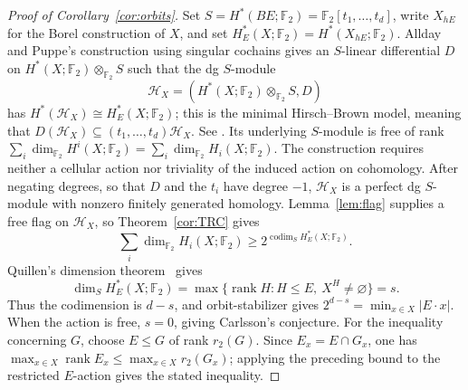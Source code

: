 \documentclass[11pt,reqno]{amsart}
\theoremstyle{plain}
\theoremstyle{definition}
\DeclareMathOperator{\rank}{rank}
\DeclareMathOperator{\codim}{codim}
\newcommand{\Ff}{\mathbb{F}}
\begin{document}
\begin{proof}[Proof of Corollary~\ref{cor:orbits}]
Set $S=H^*(BE;\Ff_2)=\Ff_2[t_1,\dots,t_d]$, write $X_{hE}$ for the Borel construction of $X$,
and set $H_E^*(X;\Ff_2)=H^*(X_{hE};\Ff_2)$.  Allday and Puppe's construction using singular cochains gives
an $S$-linear differential $D$ on $H^*(X;\Ff_2)\otimes_{\Ff_2}S$ such that the dg $S$-module
\[
 \mathcal H_X=(H^*(X;\Ff_2)\otimes_{\Ff_2}S,D)
\]
has $H^*(\mathcal H_X)\cong H_E^*(X;\Ff_2)$; this is the minimal Hirsch--Brown model, meaning that
$D(\mathcal H_X)\subseteq(t_1,\dots,t_d)\mathcal H_X$.  See
\cite[\S3.11, especially Recollections~(3.11.1)(3)--(4) and the construction preceding
Definition~(3.11.20)]{AlldayPuppe}.  Its underlying $S$-module is free of rank
$\sum_i\dim_{\Ff_2}H^i(X;\Ff_2)=\sum_i\dim_{\Ff_2}H_i(X;\Ff_2)$.
The construction requires neither a cellular action nor triviality of the induced action on
cohomology.
After negating degrees, so that $D$ and the $t_i$ have degree $-1$, $\mathcal H_X$ is a perfect dg
$S$-module with nonzero finitely generated homology.  Lemma~\ref{lem:flag} supplies a free flag on
$\mathcal H_X$, so
Theorem~\ref{cor:TRC} gives
\[
 \sum_i\dim_{\Ff_2}H_i(X;\Ff_2)\ge2^{\codim_S H_E^*(X;\Ff_2)}.
\]
Quillen's dimension theorem~\cite[Part~I, Theorem~7.7]{Quillen} gives
\[
 \dim_S H_E^*(X;\Ff_2)
 =\max\{\rank H:H\le E,\ X^H\ne\varnothing\}=s.
\]
Thus the codimension is $d-s$, and orbit-stabilizer gives
$2^{d-s}=\min_{x\in X}|E\cdot x|$.  When the action is free, $s=0$, giving Carlsson's conjecture.
For the inequality concerning $G$, choose $E\le G$ of rank $r_2(G)$.  Since $E_x=E\cap G_x$, one
has $\max_{x\in X}\rank E_x\le\max_{x\in X}r_2(G_x)$; applying the preceding bound to the
restricted $E$-action gives the stated inequality.
\end{proof}
\end{document}
